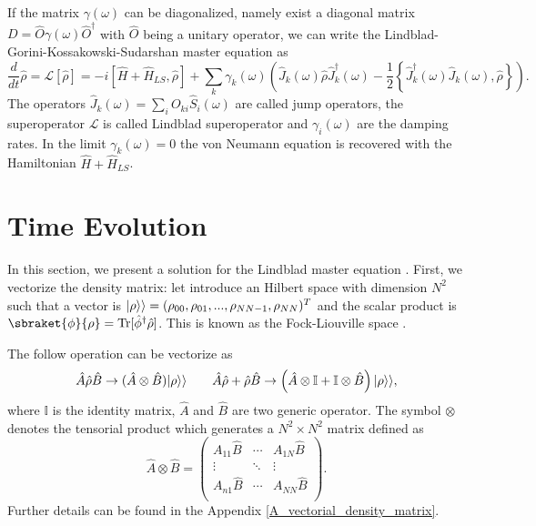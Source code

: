 If the matrix $\gamma(\omega)$ can be diagonalized, namely exist a diagonal matrix $D=\hat O \gamma(\omega) \hat O^\dagger$ with $\hat O$ being a unitary operator, we can write the Lindblad-Gorini-Kossakowski-Sudarshan master equation as
\begin{equation}\label{Lindbladian}
    \frac{d}{dt}\hat\rho =\mathcal{L}\left[\hat\rho\right] = -i\left[\hat H+\hat H_{LS},\hat\rho\right] + \sum_k \gamma_k(\omega) \left(\hat J_k(\omega) \hat\rho \hat J^\dagger_k(\omega) - \frac{1}{2}\left\{ \hat J^\dagger_k(\omega)\hat J_k(\omega), \hat\rho\right\} \right).
\end{equation}
The operators $\hat J_k(\omega)= \sum_i O_{ki} \hat S_{i}(\omega)$ are called jump operators, the superoperator $\mathcal{L}$ is called Lindblad superoperator and $\gamma_i(\omega)$ are the damping rates. In the limit $\gamma_k(\omega) = 0$ the von Neumann equation is recovered with the Hamiltonian $\hat H+\hat H_{LS}$.

\section{Time Evolution}
In this section, we present a solution for the Lindblad master equation \cite{fujii2012}. 
First, we vectorize the density matrix: let introduce an Hilbert space with dimension $N^2$ such that a vector is $\lvert\rho\rangle\rangle = (\rho_{00},\rho_{01},...,\rho_{NN-1},\rho_{NN})^T$ and the scalar product is $\sbraket{\phi}{\rho}= \Tr[\hat\phi^\dagger\hat\rho]$. This is known as the Fock-Liouville space \cite{Manzano}.

The follow operation can be vectorize as
\begin{equation}
    \hat A \hat\rho \hat B \rightarrow (\hat A\otimes\hat B)\lvert\rho\rangle\rangle \qquad \hat A \hat\rho +\hat\rho\hat B \rightarrow \left(\hat A\otimes\mathbb{I} +\mathbb{I}\otimes\hat B\right)\lvert\rho\rangle\rangle,
\end{equation}
where $\mathbb{I}$ is the identity matrix, $\hat A$ and $\hat B$ are two generic operator. The symbol $\otimes$ denotes the tensorial product which generates a $N^2\times N^2$ matrix defined as
\begin{equation}
    \hat A\otimes\hat B = \begin{pmatrix}
        A_{11} \hat B & \cdots & A_{1N}\hat B\\
        \vdots & \ddots &\vdots\\
        A_{n1}\hat B& \cdots & A_{NN}\hat B\\
    \end{pmatrix}.
\end{equation}
Further details can be found in the Appendix \ref{A_vectorial_density_matrix}.

